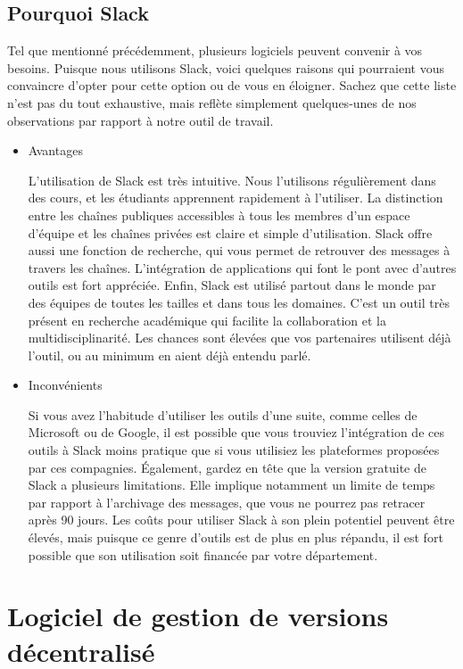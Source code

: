 \documentclass[
  letterpaper,
]{scrbook}
\begin{document}
\hypertarget{pourquoi-slack}{%
\subsection{Pourquoi Slack}\label{pourquoi-slack}}

Tel que mentionné précédemment, plusieurs logiciels peuvent convenir à
vos besoins. Puisque nous utilisons Slack, voici quelques raisons qui
pourraient vous convaincre d'opter pour cette option ou de vous en
éloigner. Sachez que cette liste n'est pas du tout exhaustive, mais
reflète simplement quelques-unes de nos observations par rapport à notre
outil de travail.

\begin{itemize}
\item
  Avantages

  L'utilisation de Slack est très intuitive. Nous l'utilisons
  régulièrement dans des cours, et les étudiants apprennent rapidement à
  l'utiliser. La distinction entre les chaînes publiques accessibles à
  tous les membres d'un espace d'équipe et les chaînes privées est
  claire et simple d'utilisation. Slack offre aussi une fonction de
  recherche, qui vous permet de retrouver des messages à travers les
  chaînes. L'intégration de applications qui font le pont avec d'autres
  outils est fort appréciée. Enfin, Slack est utilisé partout dans le
  monde par des équipes de toutes les tailles et dans tous les domaines.
  C'est un outil très présent en recherche académique qui facilite la
  collaboration et la multidisciplinarité. Les chances sont élevées que
  vos partenaires utilisent déjà l'outil, ou au minimum en aient déjà
  entendu parlé.
\item
  Inconvénients

  Si vous avez l'habitude d'utiliser les outils d'une suite, comme
  celles de Microsoft ou de Google, il est possible que vous trouviez
  l'intégration de ces outils à Slack moins pratique que si vous
  utilisiez les plateformes proposées par ces compagnies. Également,
  gardez en tête que la version gratuite de Slack a plusieurs
  limitations. Elle implique notamment un limite de temps par rapport à
  l'archivage des messages, que vous ne pourrez pas retracer après 90
  jours. Les coûts pour utiliser Slack à son plein potentiel peuvent
  être élevés, mais puisque ce genre d'outils est de plus en plus
  répandu, il est fort possible que son utilisation soit financée par
  votre département.
\end{itemize}

\hypertarget{logiciel-de-gestion-de-versions-duxe9centralisuxe9}{%
\section{Logiciel de gestion de versions
décentralisé}\label{logiciel-de-gestion-de-versions-duxe9centralisuxe9}}
\end{document}
